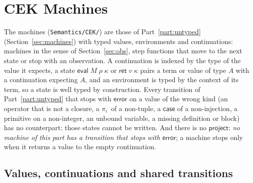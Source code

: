 \documentclass[10pt]{article}
\theoremstyle{acmplain}
\newcommand{\key}[1]{\mathsf{#1}}
\newcommand{\prj}[1]{\pi_{#1}\,}
\newcommand{\ev}[3]{\key{eval}\;#1\;#2\;#3}
\newcommand{\rt}[2]{\key{ret}\;#1\;#2}
\newcommand{\error}{\key{error}}
\begin{document}
\section{CEK Machines}\label{sec:m-cek}

The machines (\texttt{Semantics/CEK/}) are those of Part~\ref{part:untyped}
(Section~\ref{sec:machines}) with typed values, environments and
continuations: machines in the sense of Section~\ref{sec:obs}, step
functions that move to the next state or stop with an observation. A
continuation is indexed by the type of the value it expects, a state
$\ev{M}{\rho}{\kappa}$ or $\rt{v}{\kappa}$ pairs a term or value of type
$A$ with a continuation expecting $A$, and an environment is typed by the
context of its term, so a state is well typed by construction. Every
transition of Part~\ref{part:untyped} that stops with $\error$ on a value
of the wrong kind (an operator that is not a closure, a $\prj{i}$ of a
non-tuple, a $\key{case}$ of a non-injection, a primitive on a
non-integer, an unbound variable, a missing definition or block) has no
counterpart: those states cannot be written. And there is no
$\key{project}$: \emph{no machine of this part has a transition that stops
with $\error$}; a machine stops only when it returns a value to the empty
continuation.

\subsection{Values, continuations and shared transitions}\label{sec:m-cek-shared}
\end{document}
